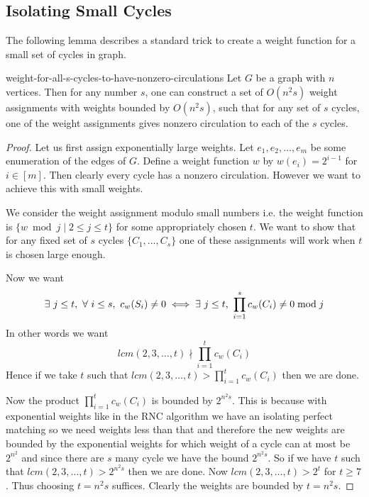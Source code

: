\subsection{Isolating Small Cycles}

The following lemma describes a standard trick to create a weight function for a small set of cycles in graph.
\begin{lemma}{\cite{ChariRohatgiSrinivasan_1993_Rou_CONF}}{weight-for-all-s-cycles-to-have-nonzero-circulations}
	Let $G$ be a graph with $n$ vertices. Then for any number $s$, one can construct a set of $O(n^2s)$ weight assignments with weights bounded by $O(n^2s)$, such that for any set of $s$ cycles, one of the weight assignments gives nonzero circulation to each of the $s$ cycles.
\end{lemma}
\begin{proof}
	Let us first assign exponentially large weights. Let $e_1, e_2,\dots , e_m$ be some enumeration of the edges of $G$. Define  a weight function $w$ by $w(e_i)=2^{i-1}$ for $i\in [m]$. Then clearly every cycle has a nonzero circulation. However we want to achieve this with small weights.
	
We consider the weight assignment modulo small numbers i.e. the weight function is $\{w\bmod j\mid 2\leq j\leq t\}$ for some appropriately chosen $t$. We want to show that for any fixed set of $s$ cycles $\{C_1,\dots, C_s\}$ one of these assignments will work when $t$ is chosen large enough. 
	
	Now we want $$\exs\ j\leq t,\ \forall\ i\leq s,\ c_w(S_i)\neq 0\iff \exs\ j\leq t,\ \prod_{i=1}^s c_w(C_i)\neq 0\bmod j$$In other words we want $$lcm(2,3,\dots, t)\nmid \prod_{i=1}^t c_w(C_i)$$Hence if we take $t$ such that $lcm(2,3,\dots, t)> \prod\limits_{i=1}^t c_w(C_i)$ then we are done. 
	
	Now the product $\prod\limits_{i=1}^t c_w(C_i)$ is bounded by $2^{n^2s}$. This is because with exponential weights {like in the RNC algorithm} we have an isolating perfect matching so we need weights less than that and therefore the new weights are bounded by the exponential weights for which weight of a cycle can at most be $2^{n^2}$ and since there are $s$ many cycle we have the bound $2^{n^2s}$. So if we have $t$ such that $lcm(2,3,\dots, t)>2^{n^2s}$ then we are done. Now $lcm(2,3,\dots,t)>2^t$ for $t\geq 7$. Thus choosing $t=n^2s$ suffices. Clearly the weights are bounded by $t=n^2s$.
\end{proof}

